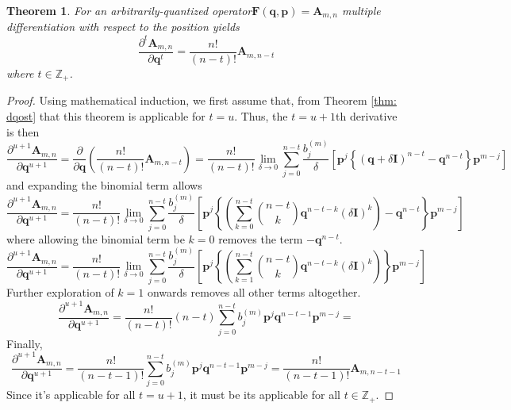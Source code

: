 \documentclass[a4paper]{article}
\newtheorem{theorem}{Theorem}[section]
\theoremstyle{definition}
\begin{document}
\begin{theorem}
	For an arbitrarily-quantized operator$\textbf{F}(\textbf{q},\textbf{p})=\textbf{A}_{m,n}$ multiple differentiation with respect to the position yields
	\begin{equation}
		\frac{\partial^t\textbf{A}_{m,n}}{\partial\textbf{q}^t}=\frac{n!}{(n-t)!}\textbf{A}_{m,n-t}
	\end{equation}
	where $t\in\mathbb{Z}_+$. 
\end{theorem}
\begin{proof}
	Using mathematical induction, we first assume that, from Theorem \ref{thm: dqost} that this theorem is applicable for $t=u$. Thus, the $t=u+1$th derivative is then
	\begin{equation}
		\frac{\partial^{u+1}{\textbf{A}_{m,n}}}{\partial\textbf{q}^{u+1}}=\frac{\partial}{\partial\textbf{q}}\left(\frac{n!}{(n-t)!}\textbf{A}_{m,n-t}\right)=\frac{n!}{(n-t)!}\lim_{\delta\to0}\sum_{j=0}^{n-t}\frac{b_j^{(m)}}{\delta}\left[\textbf{p}^j\left\{(\textbf{q}+\delta\textbf{I})^{n-t}-\textbf{q}^{n-t}\right\}\textbf{p}^{m-j}\right]
	\end{equation}
	and expanding the binomial term allows
	\begin{equation}
		\frac{\partial^{u+1}{\textbf{A}_{m,n}}}{\partial\textbf{q}^{u+1}}=\frac{n!}{(n-t)!}\lim_{\delta\to0}\sum_{j=0}^{n-t}\frac{b_j^{(m)}}{\delta}\left[\textbf{p}^j\left\{\left(\sum_{k=0}^{n-t}\binom{n-t}{k}\textbf{q}^{n-t-k}(\delta\textbf{I})^k\right)-\textbf{q}^{n-t}\right\}\textbf{p}^{m-j}\right]
	\end{equation}
	where allowing the binomial term be $k=0$ removes the term $-\textbf{q}^{n-t}$. 
	\begin{equation}
		\frac{\partial^{u+1}{\textbf{A}_{m,n}}}{\partial\textbf{q}^{u+1}}=\frac{n!}{(n-t)!}\lim_{\delta\to0}\sum_{j=0}^{n-t}\frac{b_j^{(m)}}{\delta}\left[\textbf{p}^j\left\{\left(\sum_{k=1}^{n-t}\binom{n-t}{k}\textbf{q}^{n-t-k}(\delta\textbf{I})^k\right)\right\}\textbf{p}^{m-j}\right]
	\end{equation}
	Further exploration of $k=1$ onwards removes all other terms altogether. 
	\begin{equation}
		\frac{\partial^{u+1}{\textbf{A}_{m,n}}}{\partial\textbf{q}^{u+1}}=\frac{n!}{(n-t)!}(n-t)\sum_{j=0}^{n-t}b_j^{(m)}\textbf{p}^j\textbf{q}^{n-t-1}\textbf{p}^{m-j}=
	\end{equation}
	Finally,
	\begin{equation}
		\frac{\partial^{u+1}{\textbf{A}_{m,n}}}{\partial\textbf{q}^{u+1}}=\frac{n!}{(n-t-1)!}\sum_{j=0}^{n-t}b_j^{(m)}\textbf{p}^j\textbf{q}^{n-t-1}\textbf{p}^{m-j}=\frac{n!}{(n-t-1)!}\textbf{A}_{m,n-t-1}
	\end{equation}
	Since it's applicable for all $t=u+1$, it must be its applicable for all $t\in\mathbb{Z}_+$.
\end{proof}
\end{document}
